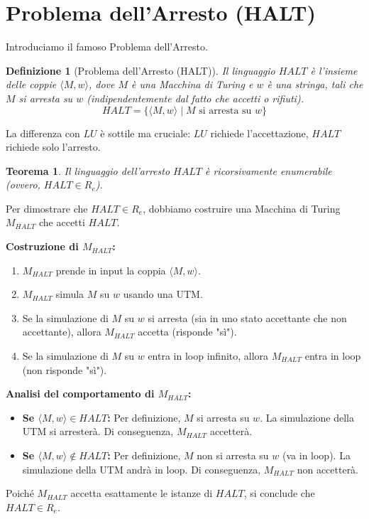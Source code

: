 \documentclass[a4paper]{article}
\makeatletter
\newtheorem{theorem}{Teorema}[section] %
\newtheorem{definition}{Definizione}[section] %
\renewenvironment{proof}[1][\proofname]{\par
  \pushQED{\qed}%
  \normalfont \topsep6\p@\@plus6\p@\relax
  \trivlist
  \item[\hskip\labelsep
        \bfseries
    #1\@addpunct{.}]\ignorespaces
}{%
  \popQED\endtrivlist\@endpefalse
}
\makeatother
\begin{document}
\section{Problema dell'Arresto (HALT)}
Introduciamo il famoso Problema dell'Arresto.
\begin{definition}[Problema dell'Arresto (HALT)]
Il linguaggio $HALT$ è l'insieme delle coppie $\langle M, w \rangle$, dove $M$ è una Macchina di Turing e $w$ è una stringa, tali che $M$ si arresta su $w$ (indipendentemente dal fatto che accetti o rifiuti).
\[ HALT = \{ \langle M, w \rangle \mid M \text{ si arresta su } w \} \]
\end{definition}
La differenza con $LU$ è sottile ma cruciale: $LU$ richiede l'accettazione, $HALT$ richiede solo l'arresto.

\begin{theorem}
Il linguaggio dell'arresto $HALT$ è ricorsivamente enumerabile (ovvero, $HALT \in R_e$).
\end{theorem}
\begin{proof}
Per dimostrare che $HALT \in R_e$, dobbiamo costruire una Macchina di Turing $M_{HALT}$ che accetti $HALT$.

\textbf{Costruzione di $M_{HALT}$:}
\begin{enumerate}
    \item $M_{HALT}$ prende in input la coppia $\langle M, w \rangle$.
    \item $M_{HALT}$ simula $M$ su $w$ usando una UTM.
    \item Se la simulazione di $M$ su $w$ si arresta (sia in uno stato accettante che non accettante), allora $M_{HALT}$ accetta (risponde "sì").
    \item Se la simulazione di $M$ su $w$ entra in loop infinito, allora $M_{HALT}$ entra in loop (non risponde "sì").
\end{enumerate}
\textbf{Analisi del comportamento di $M_{HALT}$:}
\begin{itemize}
    \item \textbf{Se $\langle M, w \rangle \in HALT$:}
    Per definizione, $M$ si arresta su $w$. La simulazione della UTM si arresterà. Di conseguenza, $M_{HALT}$ accetterà.
    \item \textbf{Se $\langle M, w \rangle \notin HALT$:}
    Per definizione, $M$ non si arresta su $w$ (va in loop). La simulazione della UTM andrà in loop. Di conseguenza, $M_{HALT}$ non accetterà.
\end{itemize}
Poiché $M_{HALT}$ accetta esattamente le istanze di $HALT$, si conclude che $HALT \in R_e$.
\end{proof}
\end{document}
